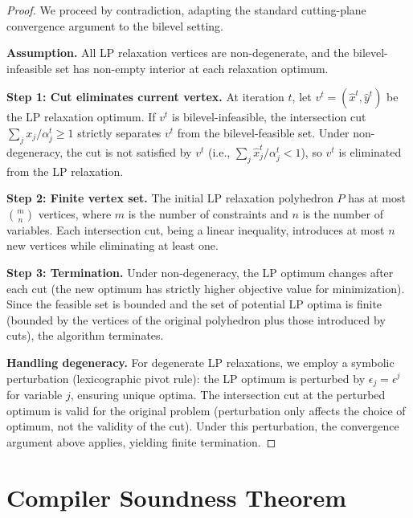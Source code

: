 \documentclass[11pt]{article}
\begin{document}
\begin{proof}
We proceed by contradiction, adapting the standard cutting-plane
convergence argument to the bilevel setting.

\textbf{Assumption.} All LP relaxation vertices are non-degenerate,
and the bilevel-infeasible set has non-empty interior at each relaxation
optimum.

\textbf{Step 1: Cut eliminates current vertex.}
At iteration $t$, let $v^t = (\hat{x}^t, \hat{y}^t)$ be the LP relaxation
optimum. If $v^t$ is bilevel-infeasible, the intersection cut
$\sum_j x_j / \alpha_j^t \geq 1$ strictly separates $v^t$ from the
bilevel-feasible set. Under non-degeneracy, the cut is not satisfied
by $v^t$ (i.e., $\sum_j \hat{x}_j^t / \alpha_j^t < 1$), so $v^t$ is
eliminated from the LP relaxation.

\textbf{Step 2: Finite vertex set.}
The initial LP relaxation polyhedron $P$ has at most $\binom{m}{n}$
vertices, where $m$ is the number of constraints and $n$ is the number
of variables. Each intersection cut, being a linear inequality, introduces
at most $n$ new vertices while eliminating at least one.

\textbf{Step 3: Termination.}
Under non-degeneracy, the LP optimum changes after each cut (the new
optimum has strictly higher objective value for minimization). Since
the feasible set is bounded and the set of potential LP optima is
finite (bounded by the vertices of the original polyhedron plus those
introduced by cuts), the algorithm terminates.

\textbf{Handling degeneracy.}
For degenerate LP relaxations, we employ a symbolic perturbation
(lexicographic pivot rule): the LP optimum is perturbed by
$\epsilon_j = \epsilon^j$ for variable $j$, ensuring unique optima.
The intersection cut at the perturbed optimum is valid for the
original problem (perturbation only affects the choice of optimum,
not the validity of the cut). Under this perturbation, the
convergence argument above applies, yielding finite termination.
\end{proof}

\section{Compiler Soundness Theorem}
\label{app:soundness}
\end{document}
